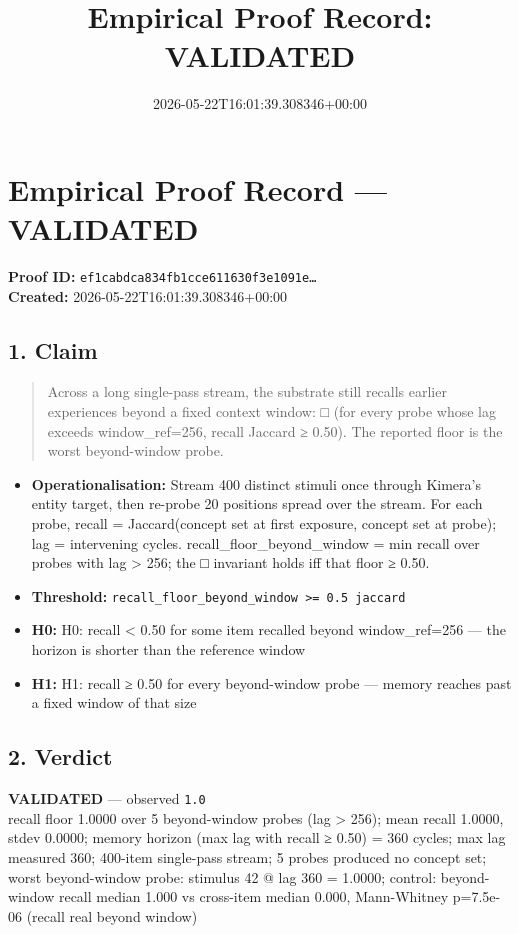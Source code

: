 \documentclass{article}
\title{Empirical Proof Record: VALIDATED}
\date{2026-05-22T16:01:39.308346+00:00}
\begin{document}
\maketitle
\section*{Empirical Proof Record --- \textcolor{validated}{\textbf{VALIDATED}}}
\textbf{Proof ID:} \texttt{ef1cabdca834fb1cce611630f3e1091e\dots}\\
\textbf{Created:} 2026-05-22T16:01:39.308346+00:00
\subsection*{1. Claim}
\begin{quote}Across a long single-pass stream, the substrate still recalls earlier experiences beyond a fixed context window: □ (for every probe whose lag exceeds window\_ref=256, recall Jaccard ≥ 0.50). The reported floor is the worst beyond-window probe.\end{quote}
\begin{itemize}
\item \textbf{Operationalisation:} Stream 400 distinct stimuli once through Kimera's entity target, then re-probe 20 positions spread over the stream. For each probe, recall = Jaccard(concept set at first exposure, concept set at probe); lag = intervening cycles. recall\_floor\_beyond\_window = min recall over probes with lag > 256; the □ invariant holds iff that floor ≥ 0.50.
\item \textbf{Threshold:} \texttt{recall\_floor\_beyond\_window >= 0.5 jaccard}
\item \textbf{H0:} H0: recall < 0.50 for some item recalled beyond window\_ref=256 — the horizon is shorter than the reference window
\item \textbf{H1:} H1: recall ≥ 0.50 for every beyond-window probe — memory reaches past a fixed window of that size
\end{itemize}
\subsection*{2. Verdict}
\textcolor{validated}{\textbf{VALIDATED}} --- observed \texttt{1.0}\\
recall floor 1.0000 over 5 beyond-window probes (lag > 256); mean recall 1.0000, stdev 0.0000; memory horizon (max lag with recall ≥ 0.50) = 360 cycles; max lag measured 360; 400-item single-pass stream; 5 probes produced no concept set; worst beyond-window probe: stimulus 42 @ lag 360 = 1.0000; control: beyond-window recall median 1.000 vs cross-item median 0.000, Mann-Whitney p=7.5e-06 (recall real beyond window)
\end{document}
